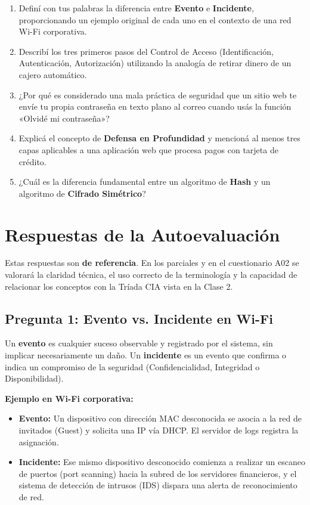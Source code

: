 \documentclass[11pt,a4paper]{article}
\begin{document}
\begin{enumerate}[leftmargin=*]
  \item Definí con tus palabras la diferencia entre \textbf{Evento} e \textbf{Incidente}, proporcionando un ejemplo original de cada uno en el contexto de una red Wi-Fi corporativa.
  \item Describí los tres primeros pasos del Control de Acceso (Identificación, Autenticación, Autorización) utilizando la analogía de retirar dinero de un cajero automático.
  \item ¿Por qué es considerado una mala práctica de seguridad que un sitio web te envíe tu propia contraseña en texto plano al correo cuando usás la función «Olvidé mi contraseña»?
  \item Explicá el concepto de \textbf{Defensa en Profundidad} y mencioná al menos tres capas aplicables a una aplicación web que procesa pagos con tarjeta de crédito.
  \item ¿Cuál es la diferencia fundamental entre un algoritmo de \textbf{Hash} y un algoritmo de \textbf{Cifrado Simétrico}?
\end{enumerate}

\section{Respuestas de la Autoevaluación}\label{sec:respuestas}

\begin{clave}
Estas respuestas son \textbf{de referencia}. En los parciales y en el cuestionario A02 se valorará la claridad técnica, el uso correcto de la terminología y la capacidad de relacionar los conceptos con la Tríada CIA vista en la Clase 2.
\end{clave}

\subsection*{Pregunta 1: Evento vs. Incidente en Wi-Fi}
\begin{respuesta}
Un \textbf{evento} es cualquier suceso observable y registrado por el sistema, sin implicar necesariamente un daño. Un \textbf{incidente} es un evento que confirma o indica un compromiso de la seguridad (Confidencialidad, Integridad o Disponibilidad).

\textbf{Ejemplo en Wi-Fi corporativa:}
\begin{itemize}[leftmargin=*]
  \item \textbf{Evento:} Un dispositivo con dirección MAC desconocida se asocia a la red de invitados (Guest) y solicita una IP vía DHCP. El servidor de logs registra la asignación.
  \item \textbf{Incidente:} Ese mismo dispositivo desconocido comienza a realizar un escaneo de puertos (port scanning) hacia la subred de los servidores financieros, y el sistema de detección de intrusos (IDS) dispara una alerta de reconocimiento de red.
\end{itemize}
\end{respuesta}
\end{document}
